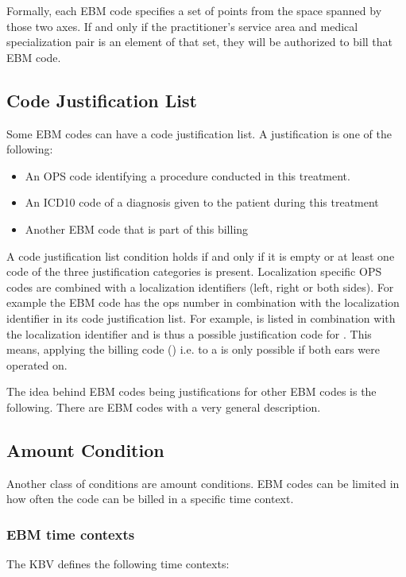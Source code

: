 Formally, each EBM code specifies a set of points from the space spanned by those two axes.
If and only if the practitioner's service area and medical specialization pair is an element of that set, they will be authorized to bill that EBM code.


\subsection{Code Justification List}
Some EBM codes can have a code justification list.
A justification is one of the following:
\begin{itemize}
    \item An OPS code identifying a procedure conducted in this treatment.
    \item An ICD10 code of a diagnosis given to the patient during this treatment
    \item Another EBM code that is part of this billing
\end{itemize}
A code justification list condition holds if and only if it is empty or at least one code of the three justification categories is present.
Localization specific OPS codes are combined with a localization identifiers (left, right or both sides).
For example the EBM code  has the ops number  in combination with the  localization identifier in its code justification list.
For example,  is listed in combination with the  localization identifier and is thus a possible justification code for .
This means, applying the billing code  () i.e.  to a  is only possible if both ears were operated on.

The idea behind EBM codes being justifications for other EBM codes is the following.
There are EBM codes with a very general description.

\subsection{Amount Condition}

Another class of conditions are amount conditions.
EBM codes can be limited in how often the code can be billed in a specific time context.

\subsubsection{EBM time contexts}
The KBV defines the following time contexts:

